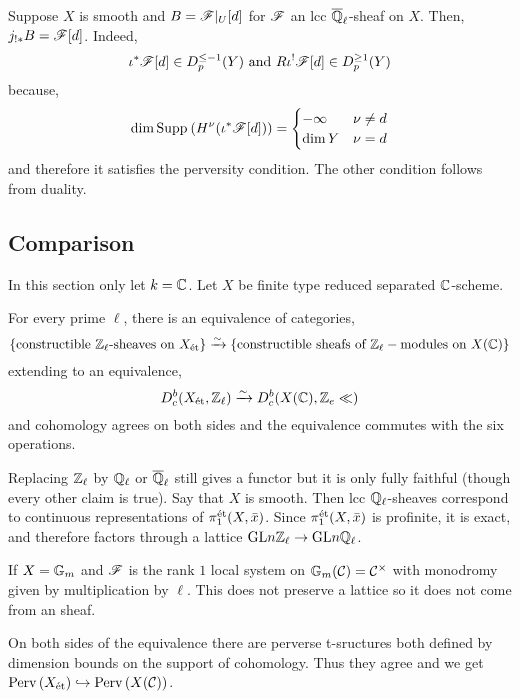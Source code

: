 \documentclass[12pt]{article}
\begin{document}
\begin{example}
Suppose $X$ is smooth and $B = \mathscr{F}|_U[d]$ for $\mathscr{F}$ an lcc $\overline{\mathbb{Q}}_\ell$-sheaf on $X$. Then, $j_{!*} B = \mathscr{F}[d]$. Indeed,
\[ \iota^* \mathscr{F}[d] \in D_p^{\le - 1}(Y) \text{ and } R \iota^! \mathscr{F}[d] \in D_p^{\ge 1}(Y) \]
because,
\[ \dim{\mathrm{Supp}_{} \left( H^\nu(\iota^* \mathscr{F}[d]) \right) } = 
\begin{cases}
-\infty & \nu \neq d
\\
\dim{Y} & \nu = d 
\end{cases} \]
and therefore it satisfies the perversity condition. The other condition follows from duality.
\end{example}

\subsection{Comparison}

In this section only let $k = \mathbb{C}$. Let $X$ be finite type reduced separated $\mathbb{C}$-scheme. 

\begin{thm}[BBD, 6.12]
For every prime $\ell$, there is an equivalence of categories,
\[ \{ \text{constructible } \mathbb{Z}_\ell\text{-sheaves on } X_{\text{\'{e}t}} \} \xrightarrow{\sim} \{ \text{constructible sheafs of } \mathbb{Z}_\ell-\text{modules on } X(\mathbb{C}) \} \]
extending to an equivalence,
\[ D_c^b(X_{\text{\'{e}t}}, \mathbb{Z}_\ell) \xrightarrow{\sim} D^b_c(X(\mathbb{C}), \mathbb{Z}_e\ll) \]
and cohomology agrees on both sides and the equivalence commutes with the six operations. 
\end{thm}

\begin{rmk}
Replacing $\mathbb{Z}_\ell$ by $\mathbb{Q}_\ell$ or $\overline{\mathbb{Q}}_\ell$ still gives a functor but it is only fully faithful (though every other claim is true). Say that $X$ is smooth. Then lcc $\mathbb{Q}_\ell$-sheaves correspond to continuous representations of $\pi_1^{\text{\'{e}t}}(X, \bar{x})$. Since $\pi_1^{\text{\'{e}t}}(X, \bar{x})$ is profinite, it is exact, and therefore factors through a lattice $\mathrm{GL}{n}{\mathbb{Z}_\ell} \to \mathrm{GL}{n}{\mathbb{Q}_\ell}$. 
\end{rmk}

\begin{example}
If $X = \mathbb{G}_m$ and $\mathscr{F}$ is the rank $1$ local system on $\mathbb{G}_m(\mathcal{C}) = \mathcal{C}^\times$ with monodromy given by multiplication by $\ell$. This does not preserve a lattice so it does not come from an \etale sheaf. 
\end{example}

\begin{rmk}
On both sides of the equivalence there are perverse t-sructures both defined by dimension bounds on the support of cohomology. Thus they agree and we get $\mathrm{Perv}\left( X_{\text{\'{e}t}} \right) \hookrightarrow \mathrm{Perv}\left( X(\mathcal{C}) \right)$.
\end{rmk}
\end{document}
